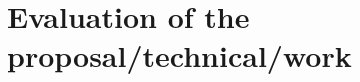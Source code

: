 \documentclass[../main.tex]{subfiles}
\begin{document}
\chapter{Evaluation of the proposal/technical/work} %
\label{cha:eval}

\end{document}
